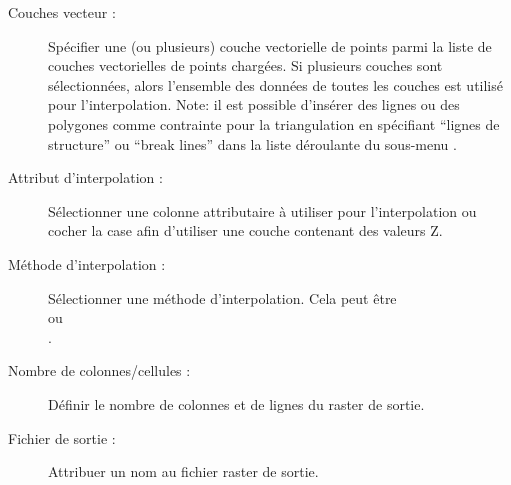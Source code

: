 \begin{description}
\item[Couches vecteur :] Spécifier une (ou plusieurs) couche 
vectorielle de points parmi la liste de couches vectorielles de points 
chargées. Si plusieurs couches sont sélectionnées, alors l'ensemble des 
données de toutes les couches est utilisé pour l'interpolation. 
Note: il est possible d'insérer des lignes ou des polygones comme contrainte 
pour la triangulation en spécifiant ``lignes de structure'' ou ``break lines'' 
dans la liste déroulante du sous-menu .
\item[Attribut d'interpolation :] Sélectionner une colonne 
attributaire à utiliser pour l'interpolation ou cocher la case 
 afin d'utiliser une
couche contenant des valeurs Z.
\item[Méthode d'interpolation :] Sélectionner une méthode 
d'interpolation. Cela peut être\\  
ou\\ .
\item[Nombre de colonnes/cellules :] Définir le nombre de colonnes et 
de lignes du raster de sortie.
\item[Fichier de sortie :] Attribuer un nom au fichier raster de 
sortie.
\end{description}

